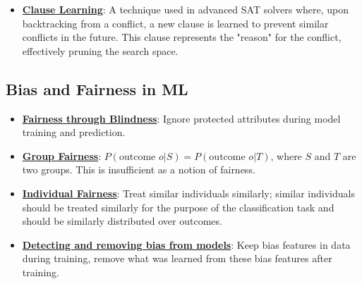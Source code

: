 \documentclass{article}%
\begin{document}
\begin{itemize}[leftmargin=*]
\item \href{https://purdue.brightspace.com/d2l/common/assets/pdfjs-d2l-dist/1.0.14-legacy/web/viewer.html?file=%2Fcontent%2Fenforced%2F1095467-wl.202510.CS.24300.001%2F15L2-SAT.pdf%3Fou%3D1095467&lang=en-us&container=d2l-fileviewer-rendered-pdf&fullscreen=d2l-fileviewer-rendered-pdf-dialog&height=667#page=35}{\textbf{Clause Learning}}: A technique used in advanced SAT solvers where, upon backtracking from a conflict, a new clause is learned to prevent similar conflicts in the future. This clause represents the "reason" for the conflict, effectively pruning the search space.%
\end{itemize}

%
\subsection{Bias and Fairness in ML}%
\label{subsec:BiasandFairnessinML}%
\begin{itemize}[leftmargin=*]%
\item \href{https://purdue.brightspace.com/d2l/common/assets/pdfjs-d2l-dist/1.0.14-legacy/web/viewer.html?file=%2Fcontent%2Fenforced%2F1095467-wl.202510.CS.24300.001%2F16L2-ethics.pdf%3Fou%3D1095467&lang=en-us&container=d2l-fileviewer-rendered-pdf&fullscreen=d2l-fileviewer-rendered-pdf-dialog&height=667#page=25}{\textbf{Fairness through Blindness}}: Ignore protected attributes during model training and prediction.%
\item \href{https://purdue.brightspace.com/d2l/common/assets/pdfjs-d2l-dist/1.0.14-legacy/web/viewer.html?file=%2Fcontent%2Fenforced%2F1095467-wl.202510.CS.24300.001%2F16L2-ethics.pdf%3Fou%3D1095467&lang=en-us&container=d2l-fileviewer-rendered-pdf&fullscreen=d2l-fileviewer-rendered-pdf-dialog&height=667#page=26}{\textbf{Group Fairness}}: $P(\text{outcome } o | S) = P(\text{outcome } o | T)$, where $S$ and $T$ are two groups. This is insufficient as a notion of fairness.%
\item \href{https://purdue.brightspace.com/d2l/common/assets/pdfjs-d2l-dist/1.0.14-legacy/web/viewer.html?file=%2Fcontent%2Fenforced%2F1095467-wl.202510.CS.24300.001%2F16L2-ethics.pdf%3Fou%3D1095467&lang=en-us&container=d2l-fileviewer-rendered-pdf&fullscreen=d2l-fileviewer-rendered-pdf-dialog&height=667#page=27}{\textbf{Individual Fairness}}: Treat similar individuals similarly; similar individuals should be treated similarly for the purpose of the classification task and should be similarly distributed over outcomes.%
\item \href{https://purdue.brightspace.com/d2l/common/assets/pdfjs-d2l-dist/1.0.14-legacy/web/viewer.html?file=%2Fcontent%2Fenforced%2F1095467-wl.202510.CS.24300.001%2F16L2-ethics.pdf%3Fou%3D1095467&lang=en-us&container=d2l-fileviewer-rendered-pdf&fullscreen=d2l-fileviewer-rendered-pdf-dialog&height=667#page=34}{\textbf{Detecting and removing bias from models}}: Keep bias features in data during training, remove what was learned from these bias features after training.%
\end{itemize}
\end{document}
